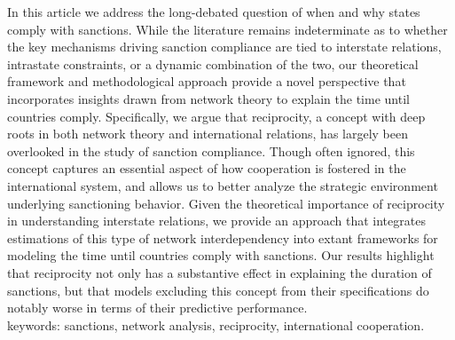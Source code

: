 
In this article we address the long-debated question of when and why states comply with sanctions. While the literature remains indeterminate as to whether the key mechanisms driving sanction compliance are tied to interstate relations, intrastate constraints, or a dynamic combination of the two, our theoretical framework and methodological approach provide a novel perspective that incorporates insights drawn from network theory to explain the time until countries comply. Specifically, we argue that reciprocity, a concept with deep roots in both network theory and international relations, has largely been overlooked in the study of sanction compliance. Though often ignored, this concept captures an essential aspect of how cooperation is fostered in the international system, and allows us to better analyze the strategic environment underlying sanctioning behavior. Given the theoretical importance of reciprocity in understanding interstate relations, we provide an approach that integrates estimations of this type of network interdependency into extant frameworks for modeling the time until countries comply with sanctions. Our results highlight that reciprocity not only has a substantive effect in explaining the duration of sanctions, but that models excluding this concept from their specifications do notably worse in terms of their predictive performance.\\

keywords: sanctions, network analysis, reciprocity, international cooperation.

